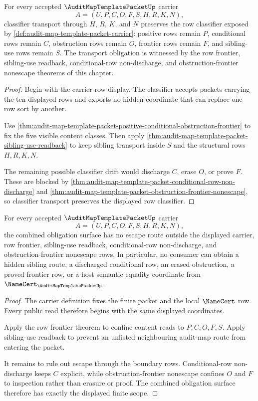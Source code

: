 \begin{theorem}
\label{thm:audit-map-template-packet-classifier-transport-obligation}
For every accepted $\AuditMapTemplatePacketUp$ carrier
$$
A=(U,P,C,O,F,S,H,R,K,N),
$$
classifier transport through $H$, $R$, $K$, and $N$ preserves the row classifier exposed by \autoref{def:audit-map-template-packet-carrier}: positive rows remain $P$, conditional rows remain $C$, obstruction rows remain $O$, frontier rows remain $F$, and sibling-use rows remain $S$. The transport obligation is witnessed by the row frontier, sibling-use readback, conditional-row non-discharge, and obstruction-frontier nonescape theorems of this chapter.
\end{theorem}
\begin{proof}
Begin with the carrier row display. The classifier accepts packets carrying the ten displayed rows and exports no hidden coordinate that can replace one row sort by another.

Use \autoref{thm:audit-map-template-packet-positive-conditional-obstruction-frontier} to fix the five visible content classes. Then apply \autoref{thm:audit-map-template-packet-sibling-use-readback} to keep sibling transport inside $S$ and the structural rows $H,R,K,N$.

The remaining possible classifier drift would discharge $C$, erase $O$, or prove $F$. These are blocked by \autoref{thm:audit-map-template-packet-conditional-row-non-discharge} and \autoref{thm:audit-map-template-packet-obstruction-frontier-nonescape}, so classifier transport preserves the displayed row classifier.
\end{proof}

\begin{theorem}
\label{thm:audit-map-template-packet-nonescape-obligation}
For every accepted $\AuditMapTemplatePacketUp$ carrier
$$
A=(U,P,C,O,F,S,H,R,K,N),
$$
the combined obligation surface has no escape route outside the displayed carrier, row frontier, sibling-use readback, conditional-row non-discharge, and obstruction-frontier nonescape rows. In particular, no consumer can obtain a hidden sibling route, a discharged conditional row, an erased obstruction, a proved frontier row, or a host semantic equality coordinate from $\NameCert_{\AuditMapTemplatePacketUp}$.
\end{theorem}
\begin{proof}
The carrier definition fixes the finite packet and the local $\NameCert$ row. Every public read therefore begins with the same displayed coordinates.

Apply the row frontier theorem to confine content reads to $P,C,O,F,S$. Apply sibling-use readback to prevent an unlisted neighbouring audit-map route from entering the packet.

It remains to rule out escape through the boundary rows. Conditional-row non-discharge keeps $C$ explicit, while obstruction-frontier nonescape confines $O$ and $F$ to inspection rather than erasure or proof. The combined obligation surface therefore has exactly the displayed finite scope.
\end{proof}

